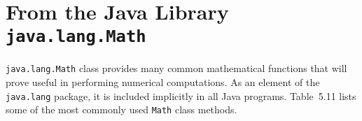 




\section{{\bf From the Java Library} {\tt java.lang.Math}}

 {\tt java.lang.Math} class provides many common
\WWWjava 
mathematical functions that will prove useful in performing numerical
computations.  As an element of the {\tt java.lang} package, it is
included implicitly in all Java programs. Table~5.11 lists some of the
most commonly used {\tt Math} class \mbox{methods.}

